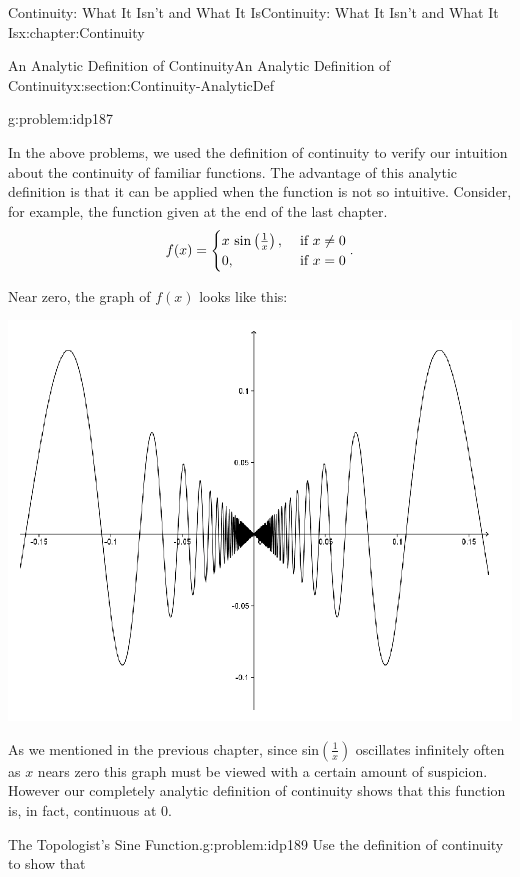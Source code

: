 \begin{chapterptx}{Continuity: What It Isn't and What It Is}{}{Continuity: What It Isn't and What It Is}{}{}{x:chapter:Continuity}
\begin{sectionptx}{An Analytic Definition of Continuity}{}{An Analytic Definition of Continuity}{}{}{x:section:Continuity-AnalyticDef}
\begin{problem}{}{g:problem:idp187}
		\end{problem}
		In the above problems, we used the definition of continuity to verify our intuition about the continuity of familiar functions.  The advantage of this analytic definition is that it can be applied when the function is not so intuitive.  Consider, for example, the function given at the end of the last chapter.%
		\begin{equation*}
			f(x)= \begin{cases}
				x\,\sin\left(\frac{1}{x}\right),& \text{ if } x\neq 0\\
				0, & \text{ if } x=0 
			\end{cases}  \text{.}
		\end{equation*}
		\par
		Near zero, the graph of \(f(x)\) looks like this:%
		\begin{image}{0.125}{0.75}{0.125}%
			\includegraphics[width=\linewidth]{external/images/Ch5fig4.png}
		\end{image}%
		As we mentioned in the previous chapter, since sin\(\left(\frac{1}{x}\right)\) oscillates infinitely often as \(x\) nears zero this graph must be viewed with a certain amount of suspicion.  However our completely analytic definition of continuity shows that this function is, in fact, continuous at 0.%
		\begin{problem}{The Topologist's Sine Function.}{g:problem:idp189}%
			 Use the definition of continuity to show that%
			\begin{equation*}

\end{equation*}
\end{problem}
\end{sectionptx}
\end{chapterptx}
